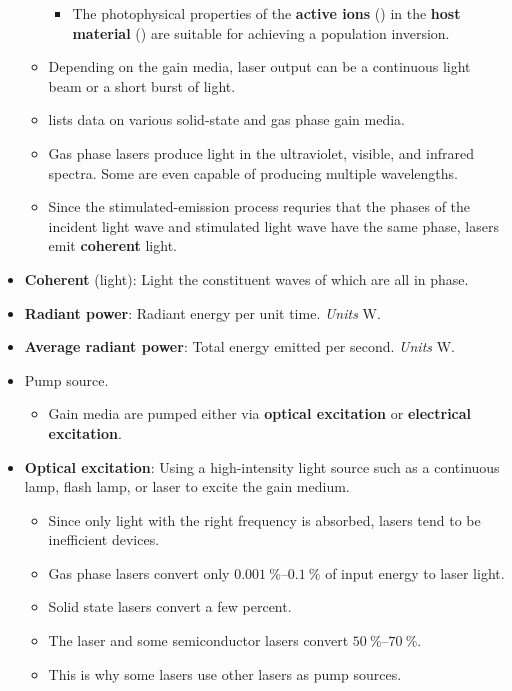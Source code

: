 \documentclass[../notes.tex]{subfiles}
\begin{document}
\begin{itemize}
\begin{itemize}
\begin{itemize}
            \item The photophysical properties of the \textbf{active ions} () in the \textbf{host material} () are suitable for achieving a population inversion.
        \end{itemize}
        \item Depending on the gain media, laser output can be a continuous light beam or a short burst of light.
        \item \textcite{bib:McQuarrieSimon} lists data on various solid-state and gas phase gain media.
        \item Gas phase lasers produce light in the ultraviolet, visible, and infrared spectra. Some are even capable of producing multiple wavelengths.
        \item Since the stimulated-emission process requries that the phases of the incident light wave and stimulated light wave have the same phase, lasers emit \textbf{coherent} light.
    \end{itemize}
    \item \textbf{Coherent} (light): Light the constituent waves of which are all in phase.
    \item \textbf{Radiant power}: Radiant energy per unit time. \emph{Units} $\si{\watt}$.
    \item \textbf{Average radiant power}: Total energy emitted per second. \emph{Units} $\si{\watt}$.
    \item Pump source.
    \begin{itemize}
        \item Gain media are pumped either via \textbf{optical excitation} or \textbf{electrical excitation}.
    \end{itemize}
    \item \textbf{Optical excitation}: Using a high-intensity light source such as a continuous lamp, flash lamp, or laser to excite the gain medium.
    \begin{itemize}
        \item Since only light with the right frequency is absorbed, lasers tend to be inefficient devices.
        \item Gas phase lasers convert only $\SIrange{0.001}{0.1}{\percent}$ of input energy to laser light.
        \item Solid state lasers convert a few percent.
        \item The  laser and some semiconductor lasers convert $\SIrange{50}{70}{\percent}$.
        \item This is why some lasers use other lasers as pump sources.

\end{itemize}
\end{itemize}
\end{document}
